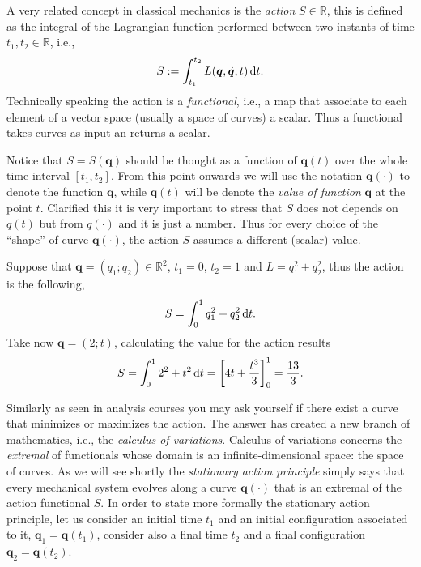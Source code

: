 		A very related concept in classical mechanics is the \emph{action} $S\in\mathbb{R}$, this is defined as the integral of the Lagrangian function performed between two instants of time $t_{1},t_{2}\in\mathbb{R}$, i.e.,
		\begin{equation}
			\label{eq:actiondefinition}
			S := \int_{t_{1}}^{t_{2}}L(\bm{q},\dot{\bm{q}},t)\mathop{}\!\mathrm{d} t.
		\end{equation}
		Technically speaking the action is a \emph{functional}, i.e., a map that associate to each element of a vector space (usually a space of curves) a scalar. Thus a functional takes curves as input an returns a scalar.
		\begin{remark}
			Notice that $S=S(\bm{q})$ should be thought as a function of $\bm{q}(t)$ over the whole time interval $[t_{1},t_{2}]$. From this point onwards we will use the notation $\bm{q}(\cdot)$ to denote the function $\bm{q}$, while $\bm{q}(t)$ will be denote the \emph{value of function} $\bm{q}$ at the point $t$. Clarified this it is very important to stress that $S$ does not depends on $q(t)$ but from $q(\cdot)$ and it is just a number. Thus for every choice of the ``shape'' of curve $\bm{q}(\cdot)$, the action $S$ assumes a different (scalar) value.
		\end{remark}
		\begin{example}
			Suppose that $\bm{q} = (q_{1};q_{2})\in\mathbb{R}^{2}$, $t_{1} = 0$, $t_{2} = 1$ and $L = q_{1}^{2} + q_{2}^{2}$, thus the action is the following, 
			\begin{equation*}
				S = \int_{0}^{1} q_{1}^2 +q_{2}^{2}\mathop{}\!\mathrm{d} t.
			\end{equation*}
			Take now $\bm{q} = (2;t)$, calculating the value for the action results
			\begin{equation*}
				S = \int_{0}^{1} 2^{2} + t^{2}\mathop{}\!\mathrm{d} t = \left[4t+\frac{t^{3}}{3}\right]_{0}^{1} = \frac{13}{3}.
			\end{equation*}
		\end{example}
		Similarly as seen in analysis courses you may ask yourself if there exist a curve that minimizes or maximizes the action. The answer has created a new branch of mathematics, i.e., the \emph{calculus of variations}. Calculus of variations concerns the \emph{extremal} of functionals whose domain is an infinite-dimensional space: the space of curves. As we will see shortly the \emph{stationary action principle} simply says that every mechanical system evolves along a curve $\bm{q}(\cdot)$ that is an extremal of the action functional $S$.
		In order to state more formally the stationary action principle, let us consider an initial time $t_{1}$ and an initial configuration associated to it, $\bm{q}_{1} = \bm{q}(t_{1})$, consider also a final time $t_{2}$ and a final configuration $\bm{q}_{2}=\bm{q}(t_{2})$.
